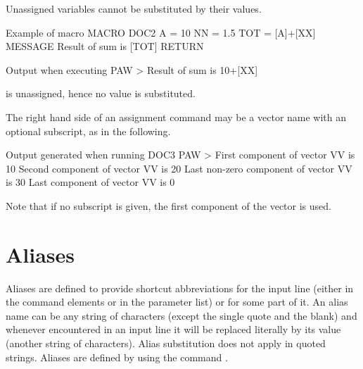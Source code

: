 Unassigned variables cannot be substituted by their values.

\begin{XMPin}[.54]{Example of macro}
   MACRO DOC2
      A = 10
      NN = 1.5
      TOT = [A]+[XX]
      MESSAGE Result of sum is [TOT]
   RETURN
\end{XMPin}
\begin{XMPout}[.45]{Output when executing}
PAW > 
Result of sum is 10+[XX]

{\rm {} is unassigned, hence no value is substituted.}
\end{XMPout}
 
\newpage

The right hand side of an assignment command may be a vector name with an
optional subscript, as in the following.
 
 
\begin{XMPt}{Output generated when running DOC3}
PAW > 
First component of vector VV is 10
Second component of vector VV is 20
Last non-zero component of vector VV is 30
Last component of vector VV is 0
\end{XMPt}
 
Note that if no subscript is given, the first component of
the vector is used.
%
%
\newpage
\section{Aliases}


Aliases are defined to provide shortcut abbreviations for the input line
(either in the command elements or in the parameter list) or for some part of it.
An alias name can be any string of characters
(except the single quote and the blank) and whenever encountered
in an input line it will be replaced literally by its value (another string
of characters).
Alias substitution does not apply in quoted strings.
Aliases are defined by using the command .

